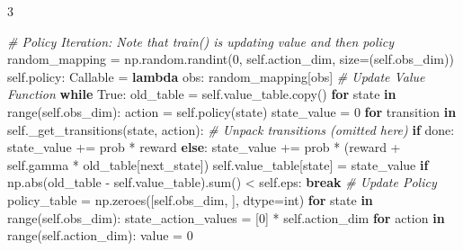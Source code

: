 \documentclass{article}
\newenvironment{Shaded}{\CodeFontSize\setlength{\topsep}{\CodeBlockSkip}\setlength{\partopsep}{0pt}}{}
\newcommand{\BuiltInTok}[1]{\textcolor[rgb]{0.00,0.50,0.00}{#1}}
\newcommand{\CommentTok}[1]{\textcolor[rgb]{0.38,0.63,0.69}{\textit{#1}}}
\newcommand{\ControlFlowTok}[1]{\textcolor[rgb]{0.00,0.44,0.13}{\textbf{#1}}}
\newcommand{\DecValTok}[1]{\textcolor[rgb]{0.25,0.63,0.44}{#1}}
\newcommand{\KeywordTok}[1]{\textcolor[rgb]{0.00,0.44,0.13}{\textbf{#1}}}
\newcommand{\NormalTok}[1]{#1}
\newcommand{\OperatorTok}[1]{\textcolor[rgb]{0.40,0.40,0.40}{#1}}
\newcommand{\VariableTok}[1]{\textcolor[rgb]{0.10,0.09,0.49}{#1}}
\newcommand{\CodeFontSize}{\fontsize{4.8}{5.6}\selectfont}
\newcommand{\NumColumns}{3}  %
\newlength{\CodeBlockSkip}
\begin{document}
\begin{multicols*}{\NumColumns}
\begin{Shaded}
\begin{Highlighting}[]
\CommentTok{\# Policy Iteration: Note that train() is updating value and then policy}
\NormalTok{random\_mapping }\OperatorTok{=}\NormalTok{ np.random.randint(}\DecValTok{0}\NormalTok{, }\VariableTok{self}\NormalTok{.action\_dim, size}\OperatorTok{=}\NormalTok{(}\VariableTok{self}\NormalTok{.obs\_dim))}
\VariableTok{self}\NormalTok{.policy: Callable }\OperatorTok{=} \KeywordTok{lambda}\NormalTok{ obs: random\_mapping[obs]}
\CommentTok{\# Update Value Function}
\ControlFlowTok{while} \VariableTok{True}\NormalTok{:}
\NormalTok{    old\_table }\OperatorTok{=} \VariableTok{self}\NormalTok{.value\_table.copy()}
    \ControlFlowTok{for}\NormalTok{ state }\KeywordTok{in} \BuiltInTok{range}\NormalTok{(}\VariableTok{self}\NormalTok{.obs\_dim):}
\NormalTok{      action }\OperatorTok{=} \VariableTok{self}\NormalTok{.policy(state)}
\NormalTok{      state\_value }\OperatorTok{=} \DecValTok{0}
      \ControlFlowTok{for}\NormalTok{ transition }\KeywordTok{in} \VariableTok{self}\NormalTok{.\_get\_transitions(state, action):}
        \CommentTok{\# Unpack transitions (omitted here)}
        \ControlFlowTok{if}\NormalTok{ done:}
\NormalTok{          state\_value }\OperatorTok{+=}\NormalTok{ prob }\OperatorTok{*}\NormalTok{ reward}
        \ControlFlowTok{else}\NormalTok{:}
\NormalTok{          state\_value }\OperatorTok{+=}\NormalTok{ prob }\OperatorTok{*}\NormalTok{ (reward }\OperatorTok{+} \VariableTok{self}\NormalTok{.gamma }\OperatorTok{*}\NormalTok{ old\_table[next\_state])}
      \VariableTok{self}\NormalTok{.value\_table[state] }\OperatorTok{=}\NormalTok{ state\_value}
    \ControlFlowTok{if}\NormalTok{ np.}\BuiltInTok{abs}\NormalTok{(old\_table }\OperatorTok{{-}} \VariableTok{self}\NormalTok{.value\_table).}\BuiltInTok{sum}\NormalTok{() }\OperatorTok{\textless{}} \VariableTok{self}\NormalTok{.eps:}
      \ControlFlowTok{break}
\CommentTok{\# Update Policy }
\NormalTok{policy\_table }\OperatorTok{=}\NormalTok{ np.zeroes([}\VariableTok{self}\NormalTok{.obs\_dim, ], dtype}\OperatorTok{=}\BuiltInTok{int}\NormalTok{)}
\ControlFlowTok{for}\NormalTok{ state }\KeywordTok{in} \BuiltInTok{range}\NormalTok{(}\VariableTok{self}\NormalTok{.obs\_dim):}
\NormalTok{  state\_action\_values }\OperatorTok{=}\NormalTok{ [}\DecValTok{0}\NormalTok{] }\OperatorTok{*} \VariableTok{self}\NormalTok{.action\_dim}
  \ControlFlowTok{for}\NormalTok{ action }\KeywordTok{in} \BuiltInTok{range}\NormalTok{(}\VariableTok{self}\NormalTok{.action\_dim):}
\NormalTok{    value }\OperatorTok{=} \DecValTok{0} 

\end{Highlighting}
\end{Shaded}
\end{multicols*}
\end{document}
